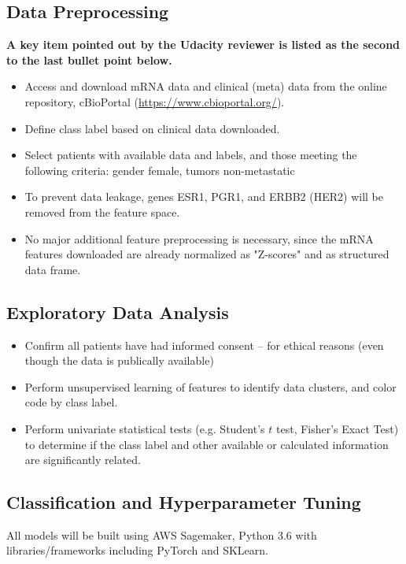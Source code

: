 \documentclass[11pt]{diazessay}
\begin{document}
\subsection{Data Preprocessing}

\textbf{A key item pointed out by the Udacity reviewer is listed as the second to the last bullet point below.}

\begin{itemize}
	\item Access and download mRNA data and clinical (meta) data from the online repository, cBioPortal (\url{https://www.cbioportal.org/}).
	\item Define class label based on clinical data downloaded.
	\item Select patients with available data and labels, and those meeting the following criteria: gender female, tumors non-metastatic
	\item To prevent data leakage, genes ESR1, PGR1, and ERBB2 (HER2) will be removed from the feature space.
	\item No major additional feature preprocessing is necessary, since the mRNA features downloaded are already normalized as "Z-scores" and as structured data frame.
\end{itemize}

\subsection{Exploratory Data Analysis}

\begin{itemize}
	\item Confirm all patients have had informed consent -- for ethical reasons (even though the data is publically available)
	\item Perform unsupervised learning of features to identify data clusters, and color code by class label.
	\item Perform univariate statistical tests (e.g. Student's $t$ test, Fisher's Exact Test) to determine if the class label and other available or calculated information are significantly related.
\end{itemize}

\subsection{Classification and Hyperparameter Tuning}

All models will be built using AWS Sagemaker, Python 3.6 with libraries/frameworks including PyTorch and SKLearn.
\end{document}
